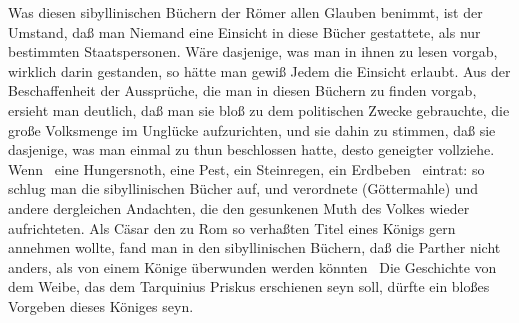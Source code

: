 \begin{aufza}
\item Was diesen sibyllinischen Büchern der Römer allen Glauben benimmt, ist der Umstand, daß man Niemand eine Einsicht in diese Bücher gestattete, als nur bestimmten Staatspersonen. Wäre dasjenige, was man in ihnen zu lesen vorgab, wirklich darin gestanden, so hätte man gewiß Jedem die Einsicht erlaubt. Aus der Beschaffenheit der Aussprüche, die man in diesen Büchern zu finden vorgab, ersieht man deutlich, daß man sie bloß zu dem politischen Zwecke gebrauchte, die große Volksmenge im Unglücke aufzurichten, und sie dahin zu stimmen, daß sie dasjenige, was man einmal zu thun beschlossen hatte, desto geneigter vollziehe. Wenn \zB\ eine Hungersnoth, eine Pest, ein Steinregen, ein Erdbeben \udgl\  eintrat: so schlug man die sibyllinischen Bücher auf, und verordnete  (Göttermahle) und andere dergleichen Andachten, die den gesunkenen Muth des Volkes wieder aufrichteten. Als Cäsar den zu Rom so verhaßten Titel eines Königs gern annehmen wollte, fand man in den sibyllinischen Büchern, daß die Parther nicht anders, als von einem Könige überwunden werden könnten \udgl\  Die Geschichte von dem Weibe, das dem Tarquinius Priskus erschienen seyn soll, dürfte ein bloßes Vorgeben dieses Königes seyn.
\end{aufza}


